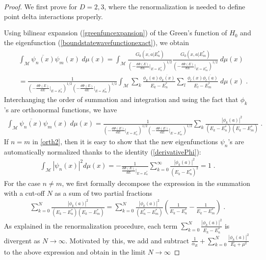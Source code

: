 \documentclass[amsmath,amssymb,14pt]{article}
\numberwithin{equation}{section}
\begin{document}
\begin{proof} We first prove for $D=2,3$, where the renormalization is needed to define point delta interactions properly. 

Using bilinear expansion (\ref{greenfuncexpansion}) of the Green's function of $H_0$ and the eigenfunction (\ref{boundstatewavefunctionexact}), we obtain
%
\begin{eqnarray}
    & &  \int_{\mathcal{M}} \overline{\psi_n(x)} \psi_m (x) \; d\mu( x) =  \int_{\mathcal{M}} \frac{\overline{G_0(x,a|E_{n}^{*})}}{ \left(-\frac{d\Phi(E)}{d E}\bigg|_{E=E_{n}^{*}}\right)^{1/2}} \frac{G_0(x,a|E_{m}^{*})}{\left(-\frac{d \Phi(E)}{d E}\bigg|_{E=E_{m}^{*}}\right)^{1/2}}  \; d\mu(x) \nonumber \\  & & = \frac{1}{\left(-\frac{d \Phi(E)}{d E}\bigg|_{E=E_{n}^{*}}\right)^{1/2} \left(-\frac{d \Phi(E)}{d E}\bigg|_{E=E_{m}^{*}}\right)^{1/2}}\int_{\mathcal{M}} \sum_k \frac{\phi_k(a) \overline{\phi_k(x)}}{E_k-E_{n}^*}  \sum_l \frac{\phi_l(x) \overline{\phi_l(a)}}{E_l-E_{m}^*}  \; d\mu(x) \;.
\end{eqnarray}
%
Interchanging the order of summation and integration and using the fact that $\phi_k$'s are orthonormal functions, we have
%
\begin{eqnarray}
 \int_{\mathcal{M}} \overline{\psi_n(x)} \psi_m (x) \; d\mu( x) = \frac{1}{\left(-\frac{d \Phi(E)}{d E}\bigg|_{E=E_{n}^{*}}\right)^{1/2} \left(-\frac{d \Phi(E)}{d E}\bigg|_{E=E_{m}^{*}}\right)^{1/2}} \sum_k \frac{|\phi_k(a)|^2}{(E_k-E_{n}^*)(E_k-E_{m}^*)} \;. \label{orth2}
\end{eqnarray}
%
If $n=m$ in \ref{orth2}, then it is easy to show that the new eigenfunctions $\psi_n$'s are automatically normalized thanks to the identity (\ref{derivativePhi}):
%
\begin{eqnarray}
    \int_{\mathcal{M}}  |\psi_n(x)|^2 d\mu(x) = -\frac{1}{\frac{d \Phi(E)}{d E}\bigg|_{E=E_{n}^{*}}} \sum_{k=0}^{\infty} 
    \frac{|\phi_k(a)|^2}{(E_k-E_n^{*})^2} = 1 \;.
\end{eqnarray}
%
%
For the case $n \neq m$, we first formally decompose the expression in the summation with a cut-off $N$ as a sum of two partial fractions
%
\begin{eqnarray}
    \sum_{k=0}^{N} \frac{|\phi_k(a)|^2}{(E_k-E_{n}^*)(E_k-E_{m}^*)} =  \sum_{k=0}^{N} \frac{|\phi_k(a)|^2}{(E_{n}^{*}-E_{m}^*)} \left( \frac{1}{E_k-E_{n}^*}-\frac{1}{E_k-E_{m}^*}\right) \;.
\end{eqnarray}
%
As explained in the renormalization procedure, each term $\sum_{k=0}^{N} \frac{|\phi_k(a)|^2}{E_k-E_{n}^*}$ is divergent as $N \to \infty$. Motivated by this, we add and subtract $\frac{1}{\alpha_R} + \sum_{k=0}^{N} \frac{|\phi_k(a)|^2}{E_k + \mu^2}$ to the above expression and obtain in the limit $N \to \infty$

\end{proof}
\end{document}
